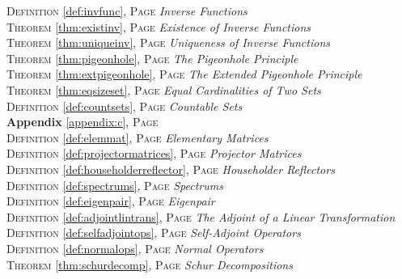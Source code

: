 \begin{multicols}{2}
{\textsc{Definition} \ref{def:invfunc}, \textsc{Page} \pageref{def:invfunc} \textit{Inverse Functions} \\
\textsc{Theorem} \ref{thm:existinv}, \textsc{Page} \pageref{thm:existinv} \textit{Existence of Inverse Functions} \\
\textsc{Theorem} \ref{thm:uniqueinv}, \textsc{Page} \pageref{thm:uniqueinv} \textit{Uniqueness of Inverse Functions} \\
\textsc{Theorem} \ref{thm:pigeonhole}, \textsc{Page} \pageref{thm:pigeonhole} \textit{The Pigeonhole Principle} \\
\textsc{Theorem} \ref{thm:extpigeonhole}, \textsc{Page} \pageref{thm:extpigeonhole} \textit{The Extended Pigeonhole Principle} \\
\textsc{Theorem} \ref{thm:eqsizeset}, \textsc{Page} \pageref{thm:eqsizeset} \textit{Equal Cardinalities of Two Sets} \\
\textsc{Definition} \ref{def:countsets}, \textsc{Page} \pageref{def:countsets} \textit{Countable Sets} \\
\textbf{Appendix} \ref{appendix:c}, \textsc{Page} \pageref{appendix:c} \\
\textsc{Definition} \ref{def:elemmat}, \textsc{Page} \pageref{def:elemmat} \textit{Elementary Matrices} \\
\textsc{Definition} \ref{def:projectormatrices}, \textsc{Page} \pageref{def:projectormatrices} \textit{Projector Matrices} \\
\textsc{Definition} \ref{def:householderreflector}, \textsc{Page} \pageref{def:householderreflector} \textit{Householder Reflectors} \\
\textsc{Definition} \ref{def:spectrums}, \textsc{Page} \pageref{def:spectrums} \textit{Spectrums} \\
\textsc{Definition} \ref{def:eigenpair}, \textsc{Page} \pageref{def:eigenpair} \textit{Eigenpair} \\
\textsc{Definition} \ref{def:adjointlintrans}, \textsc{Page} \pageref{def:adjointlintrans} \textit{The Adjoint of a Linear Transformation} \\
\textsc{Definition} \ref{def:selfadjointops}, \textsc{Page} \pageref{def:selfadjointops} \textit{Self-Adjoint Operators} \\
\textsc{Definition} \ref{def:normalops}, \textsc{Page} \pageref{def:normalops} \textit{Normal Operators} \\
\textsc{Theorem} \ref{thm:schurdecomp}, \textsc{Page} \pageref{thm:schurdecomp} \textit{Schur Decompositions} \\
}
\end{multicols}
